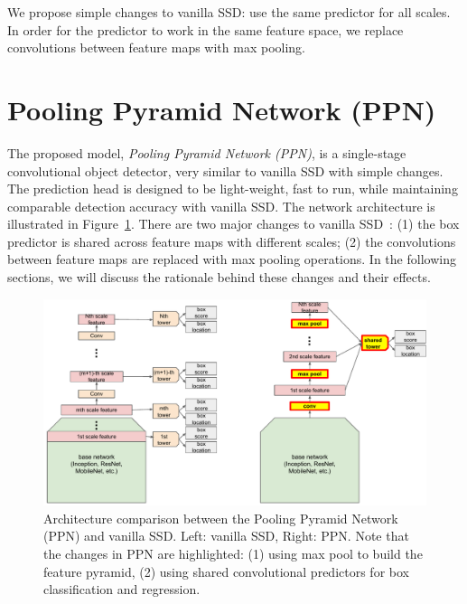 \documentclass[10pt,twocolumn,letterpaper]{article}
\begin{document}
We propose simple changes to vanilla SSD: use the same predictor
for all scales. In order for the predictor to work in the
same feature space, we replace convolutions between
feature maps with max pooling.










\section{Pooling Pyramid Network (PPN)}
The proposed model, \textit{Pooling Pyramid Network (PPN)},
is a single-stage convolutional object detector, very
similar to vanilla SSD with simple changes.  The prediction head is
designed to be light-weight, fast to run, while maintaining
comparable detection accuracy with vanilla SSD.
The network architecture is illustrated in
Figure~\ref{fig:ppn}.  There are two major changes to
vanilla SSD~\cite{liu2016ssd}: (1) the box predictor is
shared across feature maps with different scales; (2) the
convolutions between feature maps are replaced with max
pooling operations.  In the following sections, we will
discuss the rationale behind these changes and their effects.

\begin{figure}[t]
\begin{center}
\includegraphics[width=1.0\linewidth]{figure/ppn_vs_ssd.pdf}
\end{center}
\caption{
Architecture comparison between the Pooling Pyramid Network (PPN)
and vanilla SSD. Left: vanilla SSD, Right: PPN.
Note that the changes in PPN are highlighted:
(1) using max pool to build the feature pyramid,
(2) using shared convolutional predictors for box classification and regression.
}
\label{fig:ppn}
\end{figure}
\end{document}
